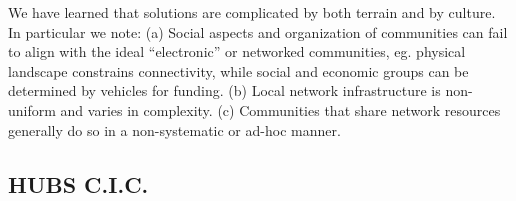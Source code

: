 We have learned that solutions are complicated by both terrain and by culture.
In particular we note:
 (a) Social aspects and organization of communities can fail to align with the
  ideal ``electronic'' or networked communities, eg. physical landscape constrains
  connectivity, while social and economic groups can be determined by vehicles for funding.
(b) Local network infrastructure is non-uniform and varies in complexity.
(c) Communities that share network resources generally do so in a
  non-systematic or ad-hoc manner.



\subsection{HUBS C.I.C.}\label{subsec:hubs}

